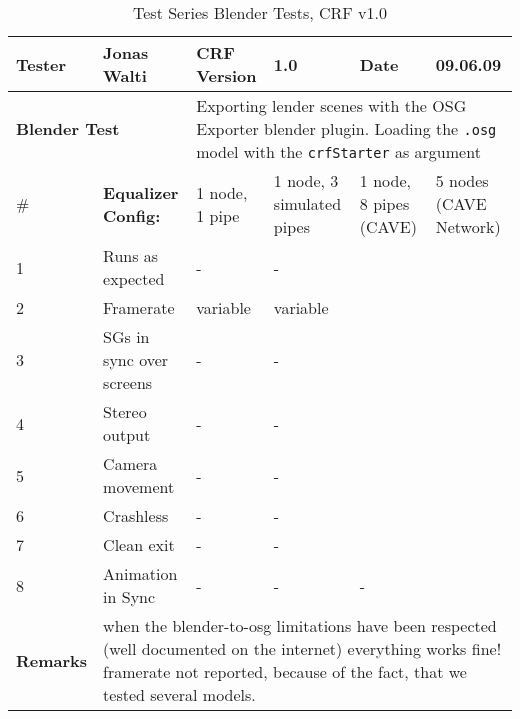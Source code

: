 \begin{table}[H]
	\centering
	\begin{tabular}{|b{}|b{}|m{}|m{}|m{}|m{}|}
		\hline
		\bfseries Tester & Jonas Walti & \bfseries CRF Version & 1.0 & \bfseries Date & 09.06.09 \\
		\hline
		\hline
		\multicolumn{2}{|l|}{\large{\bfseries Blender Test}} & \multicolumn{4}{p{0.6\textwidth}|}{Exporting lender scenes with the OSG Exporter blender plugin. Loading the \texttt{.osg} model with the \texttt{crfStarter} as argument} \\
		\hline
		\hline
		\# & \bfseries Equalizer Config: & 1 node, 1 pipe & 1 node, 3 simulated pipes &  1 node, 8 pipes (CAVE) &  5 nodes (CAVE Network) \\
		\hline 1 & Runs as expected & \quad\quad- & \quad\quad- & \tick & \tick \\
		\hline 2 & Framerate & variable & variable & \quad\quad60 & \quad\quad550 \\
		\hline 3 & SGs in sync over screens & \quad\quad- & \quad\quad- & \tick & \tick \\
		\hline 4 & Stereo output & \quad\quad- & \quad\quad- & \tick & \tick \\
		\hline 5 & Camera movement & \quad\quad- & \quad\quad- & \tick & \tick \\
		\hline 6 & Crashless & \quad\quad- & \quad\quad- & \tick & \tick \\
		\hline 7 & Clean exit & \quad\quad- & \quad\quad- & \tick & \tick \\
		\hline 8 & Animation in Sync & \quad\quad- & \quad\quad- & \quad\quad- & \tick \\
		\hline
		\hline \bfseries Remarks & \multicolumn{5}{p{0.85\textwidth}|}{when the blender-to-osg limitations have been respected (well documented on the internet) everything works fine! framerate not reported, because of the fact, that we tested several models.}\\
		\hline
	\end{tabular}
	\caption{Test Series Blender Tests, CRF v1.0}
\end{table}

